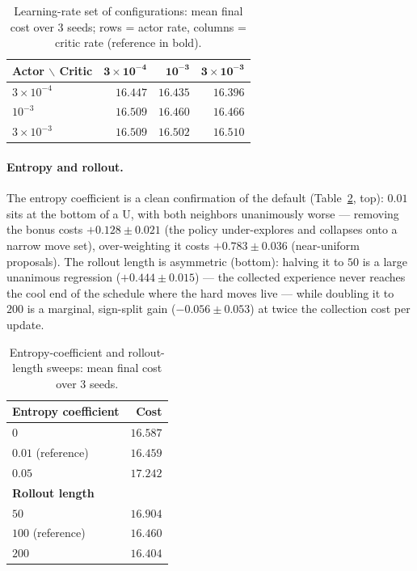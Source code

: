\documentclass[letterpaper]{article} %
\begin{document}
\begin{table}[t]
\centering
\small
\begin{tabular}{lrrr}
\toprule
\textbf{Actor $\backslash$ Critic} & $\mathbf{3\!\times\!10^{-4}}$ & $\mathbf{10^{-3}}$ & $\mathbf{3\!\times\!10^{-3}}$ \\
\midrule
$3\!\times\!10^{-4}$ & $16.447$ & $16.435$ & $16.396$ \\
$10^{-3}$            & $16.509$ & $\mathbf{16.460}$ & $16.466$ \\
$3\!\times\!10^{-3}$ & $16.509$ & $16.502$ & $16.510$ \\
\bottomrule
\end{tabular}
\caption{Learning-rate set of configurations: mean final cost over $3$ seeds; rows = actor rate, columns = critic rate (reference in bold).}
\label{tab:xlr}
\end{table}

\paragraph{Entropy and rollout.}
The entropy coefficient is a clean confirmation of the default (Table~\ref{tab:xknobs}, top): $0.01$ sits at the bottom of a U, with both neighbors unanimously worse --- removing the bonus costs $+0.128 \pm 0.021$ (the policy under-explores and collapses onto a narrow move set), over-weighting it costs $+0.783 \pm 0.036$ (near-uniform proposals). The rollout length is asymmetric (bottom): halving it to $50$ is a large unanimous regression ($+0.444 \pm 0.015$) --- the collected experience never reaches the cool end of the schedule where the hard moves live --- while doubling it to $200$ is a marginal, sign-split gain ($-0.056 \pm 0.053$) at twice the collection cost per update.

\begin{table}[t]
\centering
\small
\begin{tabular}{lr}
\toprule
\textbf{Entropy coefficient} & \textbf{Cost} \\
\midrule
$0$    & $16.587$ \\
$0.01$ (reference) & $\mathbf{16.459}$ \\
$0.05$ & $17.242$ \\
\midrule
\textbf{Rollout length} & \\
$50$  & $16.904$ \\
$100$ (reference) & $\mathbf{16.460}$ \\
$200$ & $16.404$ \\
\bottomrule
\end{tabular}
\caption{Entropy-coefficient and rollout-length sweeps: mean final cost over $3$ seeds.}
\label{tab:xknobs}
\end{table}
\end{document}
